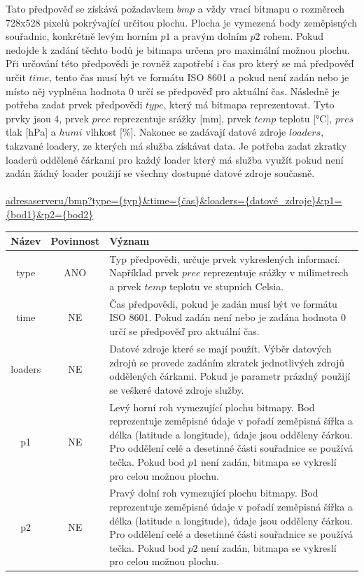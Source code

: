 \documentclass[czech,bachelor,dept460,male,csharp,cpdeclaration]{diploma}
\begin{document}
	Tato předpověď se získává požadavkem $bmp$ a vždy vrací bitmapu o rozměrech 728x528 pixelů pokrývající určitou plochu. Plocha je vymezená body zeměpisných souřadnic, konkrétně levým horním $p1$ a pravým dolním $p2$ rohem. Pokud nedojde k zadání těchto bodů je bitmapa určena pro maximální možnou plochu. Při určování této předpovědi je rovněž zapotřebí i čas pro který se má předpověď určit $time$, tento čas musí být ve formátu ISO 8601 a pokud není zadán nebo je místo něj vyplněna hodnota 0 určí se předpověď pro aktuální čas. Následně je potřeba zadat prvek předpovědi $type$, který má bitmapa reprezentovat. Tyto prvky jsou 4, prvek $prec$ reprezentuje srážky [mm], prvek $temp$ teplotu [°C], $pres$ tlak [hPa] a $humi$ vlhkost [\%]. Nakonec se zadávají datové zdroje $loaders$, takzvané loadery, ze kterých má služba získávat data. Je potřeba zadat zkratky loaderů oddělené čárkami pro každý loader který má služba využít pokud není zadán žádný loader použijí se všechny dostupné datové zdroje současně.
	\\\\
	\url{adresaserveru/bmp?type={typ}\&time={čas}\&loaders={datové\_zdroje}\&p1={bod1}\&p2={bod2}}
	
	\begin{center}
		
		
		\begin{tabular}{c c p{13cm}}
			Název & Povinnost & Význam \\
			\midrule
			type & ANO & Typ předpovědi, určuje prvek vykreslených informací. Například prvek $prec$ reprezentuje srážky v milimetrech a prvek $temp$ teplotu ve stupních Celsia.\\ 
			time & NE & Čas předpovědi, pokud je zadán musí být ve formátu ISO 8601. Pokud zadán není nebo je zadána hodnota 0  určí se předpověď pro aktuální čas.\\ 
			loaders & NE & Datové zdroje které se mají použít. Výběr datových zdrojů se provede zadáním zkratek jednotlivých zdrojů oddělených čárkami. Pokud je parametr prázdný použijí se veškeré datové zdroje služby. \\ 
			p1 & NE & Levý horní roh vymezující plochu bitmapy. Bod reprezentuje zeměpisné údaje v pořadí zeměpisná šířka a délka (latitude a longitude), údaje jsou odděleny čárkou. Pro oddělení celé a desetinné části souřadnice se používá tečka. Pokud bod $p1$ není zadán, bitmapa se vykreslí pro celou možnou plochu.\\
			p2 & NE & Pravý dolní roh vymezující plochu bitmapy. Bod reprezentuje zeměpisné údaje v pořadí zeměpisná šířka a délka (latitude a longitude), údaje jsou odděleny čárkou. Pro oddělení celé a desetinné části souřadnice se používá tečka. Pokud bod $p2$ není zadán, bitmapa se vykreslí pro celou možnou plochu.\\
		\end{tabular}
	\end{center}
	
\end{document}
